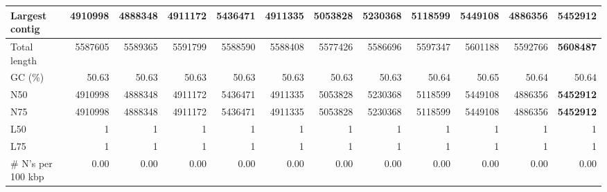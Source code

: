 \documentclass[12pt,a4paper]{article}
\begin{document}
\begin{table}[ht]
\begin{center}
\begin{tabular}{|l*{11}{|r}|}
Largest contig & 4910998 & 4888348 & 4911172 & 5436471 & 4911335 & 5053828 & 5230368 & 5118599 & 5449108 & 4886356 & {\bf 5452912} \\ \hline
Total length & 5587605 & 5589365 & 5591799 & 5588590 & 5588408 & 5577426 & 5586696 & 5597347 & 5601188 & 5592766 & {\bf 5608487} \\ \hline
GC (\%) & 50.63 & 50.63 & 50.63 & 50.63 & 50.63 & 50.63 & 50.63 & 50.64 & 50.65 & 50.64 & 50.64 \\ \hline
N50 & 4910998 & 4888348 & 4911172 & 5436471 & 4911335 & 5053828 & 5230368 & 5118599 & 5449108 & 4886356 & {\bf 5452912} \\ \hline
N75 & 4910998 & 4888348 & 4911172 & 5436471 & 4911335 & 5053828 & 5230368 & 5118599 & 5449108 & 4886356 & {\bf 5452912} \\ \hline
L50 & 1 & 1 & 1 & 1 & 1 & 1 & 1 & 1 & 1 & 1 & 1 \\ \hline
L75 & 1 & 1 & 1 & 1 & 1 & 1 & 1 & 1 & 1 & 1 & 1 \\ \hline
\# N's per 100 kbp & 0.00 & 0.00 & 0.00 & 0.00 & 0.00 & 0.00 & 0.00 & 0.00 & 0.00 & 0.00 & 0.00 \\ \hline
\end{tabular}
\end{center}
\end{table}
\end{document}
